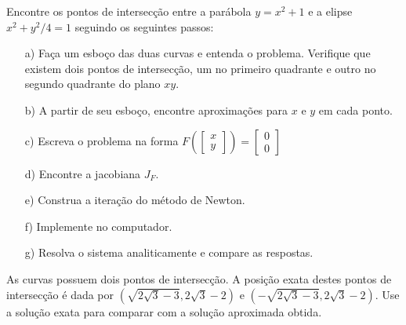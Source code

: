 \begin{exer}\label{prob_para_elipse}
 Encontre os pontos de intersecção entre a parábola $y=x^2+1$ e a elipse $x^2+y^2/4=1$ seguindo os seguintes passos:
\begin{itemize}
\item[a)] Faça um esboço das duas curvas e entenda o problema. Verifique que existem dois pontos de intersecção, um no primeiro quadrante e outro no segundo quadrante do plano $xy$.
\item[b)] A partir de seu esboço, encontre aproximações para $x$ e $y$ em cada ponto.
\item[c)] Escreva o problema na forma $F\left(\left[\begin{array}{c}x\\y\end{array}\right]\right)=\left[\begin{array}{c}0\\0\end{array}\right]$
\item[d)] Encontre a jacobiana $J_F$.
\item[e)] Construa a iteração do método de Newton.
\item[f)] Implemente no computador.
\item[g)] Resolva o sistema analiticamente e compare as respostas.
\end{itemize}
\end{exer}
\begin{resp}
As curvas possuem dois pontos de intersecção. A posição exata destes pontos de intersecção é dada por $\left(\sqrt{2\sqrt{3}-3},2\sqrt{3}-2\right)$ e $\left(-\sqrt{2\sqrt{3}-3},2\sqrt{3}-2\right)$. Use a solução exata para comparar com a solução aproximada obtida.
\end{resp}

